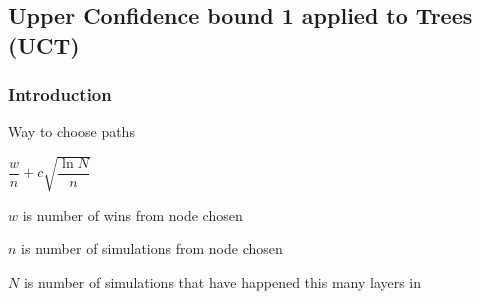 
\subsection{Upper Confidence bound 1 applied to Trees (UCT)}

\subsubsection{Introduction}

Way to choose paths

\(\dfrac{w}{n}+c\sqrt {\dfrac{\ln N}{n}}\)

\(w\) is number of wins from node chosen

\(n\) is number of simulations from node chosen

\(N\) is number of simulations that have happened this many layers in

